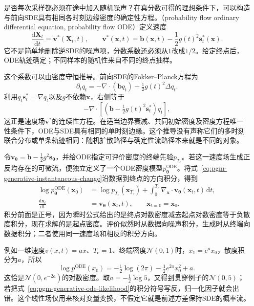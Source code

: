 是否每次采样都必须在途中加入随机噪声？在真分数可得的理想条件下，可以构造与前向SDE具有相同各时刻边缘密度的确定性方程。（probability flow ordinary differential equation, probability flow ODE）定义速度
\begin{equation}
  \label{eq:pgm-generative-probability-flow}
  \frac{\mathrm{d}\bm{X}_t}{\mathrm{d}t}
     =\bm{v}^*(\bm{X}_t,t),
  \qquad
  \bm{v}^*(\bm{x},t)
     =\bm{b}(\bm{x},t)-\frac12g(t)^2\bm{s}_t^*(\bm{x}).
\end{equation}
它不是简单地删除逆SDE的噪声项，分数系数还必须从$1$改成$1/2$。给定终点后，ODE轨迹确定；不同样本的随机性来自不同的终点抽样。

这个系数可以由密度守恒推导。前向SDE的Fokker--Planck方程为
\[
  \partial_t q_t
    =-\nabla\cdot(\bm{b}q_t)+\tfrac12g(t)^2\Delta q_t.
\]
利用$q_t\bm{s}_t^*=\nabla q_t$以及$g$不依赖$\bm{x}$，右侧等于
\[
  -\nabla\cdot
       \left[\left(\bm{b}-\tfrac12g(t)^2\bm{s}_t^*\right)q_t\right],
\]
这正是速度场$\bm{v}^*$的连续性方程。在适当边界衰减、共同初始密度及密度方程唯一性条件下，ODE与SDE具有相同的单时刻边缘。这个推导没有声称它们的多时刻联合分布或单条轨迹相同：随机扩散路径与确定性流路径本来就是不同的对象。

令$\bm{v}_{\bm{\theta}}=\bm{b}-\tfrac12g^2\bm{s}_{\bm{\theta}}$，并给ODE指定可评价密度的终端先验$p_{T_{\mathrm{c}}}$。若这一速度场生成正反均存在的可微流，便独立定义了一个ODE密度模型$p_{\bm{\theta}}^{\mathrm{ODE}}$。将式~\eqref{eq:pgm-generative-instantaneous-change}沿数据到终点的方向积分，得到
\begin{equation}
  \label{eq:pgm-generative-ode-likelihood}
  \begin{aligned}
    \log p_{\bm{\theta}}^{\mathrm{ODE}}(\bm{x}_0)
       &=\log p_{T_{\mathrm{c}}}(\bm{x}_{T_{\mathrm{c}}})
          +\int_0^{T_{\mathrm{c}}}
            \nabla_{\bm{x}}\cdot
            \bm{v}_{\bm{\theta}}(\bm{x}_t,t)\,\mathrm{d}t,\\
    \frac{\mathrm{d}\bm{x}_t}{\mathrm{d}t}
       &=\bm{v}_{\bm{\theta}}(\bm{x}_t,t),
       \qquad \bm{x}_{t=0}=\bm{x}_0.
  \end{aligned}
\end{equation}
积分前面是正号，因为瞬时公式给出的是终点对数密度减去起点对数密度等于负散度积分，现在求解的是起点密度。评价似然时从数据向噪声积分，生成时从终端向数据积分；二者使用同一速度场和相反的积分方向。

例如一维速度$v(x,t)=ax$、$T_{\mathrm{c}}=1$、终端密度$\mathcal{N}(0,1)$时，$x_1=e^a x_0$，散度积分为$a$，所以
\[
  \log p^{\mathrm{ODE}}(x_0)
  =-\tfrac12\log(2\pi)-\tfrac12e^{2a}x_0^2+a.
\]
这恰是$\mathcal{N}(0,e^{-2a})$的对数密度。取$a=-\tfrac12\log5$，又得到贯穿例子的$\mathcal{N}(0,5)$；若把式~\eqref{eq:pgm-generative-ode-likelihood}的积分符号写反，归一化因子就会出错。这个线性场仅用来核对变量变换，不假定它就是前述方差保持SDE的概率流。

